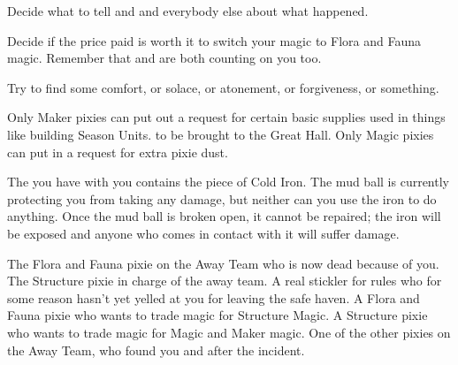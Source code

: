 \documentclass[char]{PP}
\begin{document}
\begin{itemz}
	\item Decide what to tell \cSPM{} and \cELove{} and everybody else about what happened.
	\item Decide if the price paid is worth it to switch your magic to Flora and Fauna magic. Remember that \cFWanabe{} and \cSAdvisor{} are both counting on you too.
	\item Try to find some comfort, or solace, or atonement, or forgiveness, or something.
\end{itemz}

\begin{itemz}[Notes]
	\item Only Maker pixies can put out a request for certain basic supplies used in things like building Season Units. to be brought to the Great Hall. Only Magic pixies can put in a request for extra pixie dust.
	\item The \iMudCase{} you have with you contains the piece of Cold Iron. The mud ball is currently protecting you from taking any damage, but neither can you use the iron to do anything. Once the mud ball is broken open, it cannot be repaired; the iron will be exposed and anyone who comes in contact with it will suffer damage.
\end{itemz}

\begin{contacts}
	\contact{\cFLost{}} The Flora and Fauna pixie on the Away Team who is now dead because of you.
	\contact{\cSPM{}} The Structure pixie in charge of the away team. A real stickler for rules who for some reason hasn’t yet yelled at you for leaving the safe haven.
	\contact{\cFWanabe{}} A Flora and Fauna pixie who wants to trade \cFWanabe{\their} magic for Structure Magic.
	\contact{\cSAdvisor{}} A Structure pixie who wants to trade \cSAdvisor{\their} magic for Magic and Maker magic.
	\contact{\cELove{}} One of the other pixies on the Away Team, who found you and \cFLost{} after the incident.
\end{contacts}
\end{document}
